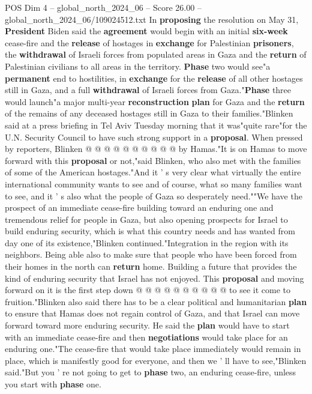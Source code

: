 \begin{textsample}{POS Dim 4 – global\_north\_2024\_06 – Score 26.00 – global\_north\_2024\_06/109024512.txt}
In \textbf{proposing} the resolution on May 31, \textbf{President} Biden said the \textbf{agreement} would begin with an initial \textbf{six-week} cease-fire and the \textbf{release} of hostages in \textbf{exchange} for Palestinian \textbf{prisoners}, the \textbf{withdrawal} of Israeli forces from populated areas in Gaza and the \textbf{return} of Palestinian civilians to all areas in the territory. \textbf{Phase} two would see"a \textbf{permanent} end to hostilities, in \textbf{exchange} for the \textbf{release} of all other hostages still in Gaza, and a full \textbf{withdrawal} of Israeli forces from Gaza."\textbf{Phase} three would launch"a major multi-year \textbf{reconstruction} \textbf{plan} for Gaza and the \textbf{return} of the remains of any deceased hostages still in Gaza to their families."Blinken said at a press briefing in Tel Aviv Tuesday morning that it was"quite rare"for the U.N.
Security Council to have such strong support in a \textbf{proposal}.
When pressed by reporters, Blinken @ @ @ @ @ @ @ @ @ @ by Hamas."It is on Hamas to move forward with this \textbf{proposal} or not,"said Blinken, who also met with the families of some of the American hostages."And it ' s very clear what virtually the entire international community wants to see and of course, what so many families want to see, and it ' s also what the people of Gaza so desperately need.""We have the prospect of an immediate cease-fire building toward an enduring one and tremendous relief for people in Gaza, but also opening prospects for Israel to build enduring security, which is what this country needs and has wanted from day one of its existence,"Blinken continued."Integration in the region with its neighbors.
Being able also to make sure that people who have been forced from their homes in the north can \textbf{return} home.
Building a future that provides the kind of enduring security that Israel has not enjoyed.
This \textbf{proposal} and moving forward on it is the first step down @ @ @ @ @ @ @ @ @ @ to see it come to fruition."Blinken also said there has to be a clear political and humanitarian \textbf{plan} to ensure that Hamas does not regain control of Gaza, and that Israel can move forward toward more enduring security.
He said the \textbf{plan} would have to start with an immediate cease-fire and then \textbf{negotiations} would take place for an enduring one."The cease-fire that would take place immediately would remain in place, which is manifestly good for everyone, and then we ' ll have to see,"Blinken said."But you ' re not going to get to \textbf{phase} two, an enduring cease-fire, unless you start with \textbf{phase} one.

\end{textsample}
